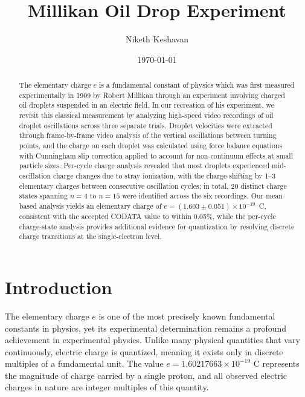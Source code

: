 \documentclass[11pt]{article}
\begin{document}
\title{Millikan Oil Drop Experiment}
\author{Niketh Keshavan}
\date{\today}
\maketitle

\begin{abstract}

The elementary charge $e$ is a fundamental constant of physics which was first measured experimentally in 1909 by Robert Millikan through an experiment involving charged oil droplets suspended in an electric field. In our recreation of his experiment, we revisit this classical measurement by analyzing high-speed video recordings of oil droplet oscillations across three separate trials. Droplet velocities were extracted through frame-by-frame video analysis of the vertical oscillations between turning points, and the charge on each droplet was calculated using force balance equations with Cunningham slip correction applied to account for non-continuum effects at small particle sizes. Per-cycle charge analysis revealed that most droplets experienced mid-oscillation charge changes due to stray ionization, with the charge shifting by 1--3 elementary charges between consecutive oscillation cycles; in total, 20 distinct charge states spanning $n = 4$ to $n = 15$ were identified across the six recordings. Our mean-based analysis yields an elementary charge of $e = (1.603 \pm 0.051) \times 10^{-19}$~C, consistent with the accepted CODATA value to within 0.05\%, while the per-cycle charge-state analysis provides additional evidence for quantization by resolving discrete charge transitions at the single-electron level.

\end{abstract}

\newpage
\section{Introduction}

The elementary charge $e$ is one of the most precisely known fundamental constants in physics, yet its experimental determination remains a profound achievement in experimental physics. Unlike many physical quantities that vary continuously, electric charge is quantized, meaning it exists only in discrete multiples of a fundamental unit. The value $e = 1.60217663 \times 10^{-19}$ C represents the magnitude of charge carried by a single proton, and all observed electric charges in nature are integer multiples of this quantity.
\end{document}
